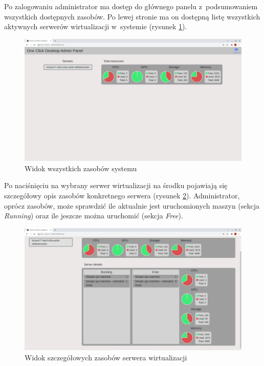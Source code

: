 \documentclass[../opis-rozwiazania.tex]{subfiles}
\begin{document}
Po zalogowaniu administrator ma dostęp do głównego panelu z~podsumowaniem wszystkich dostępnych zasobów.
Po lewej stronie ma on dostępną listę wszystkich aktywnych serwerów wirtualizacji w~systemie (rysunek \ref{figure:system_interaction.admin.panel}).

\begin{figure}[ht!]
  \centering
  \includegraphics[width=\textwidth]{resources/admin_panel_home.png}
  \caption{Widok wszystkich zasobów systemu}
  \label{figure:system_interaction.admin.panel}
\end{figure}

Po naciśnięciu na wybrany serwer wirtualizacji na środku pojawiają się szczegółowy opis zasobów konkretnego serwera (rysunek \ref{figure:system_interaction.admin.details}).
Administrator, oprócz zasobów, może sprawdzić ile aktualnie jest uruchomionych maszyn (sekcja \textit{Running}) oraz ile jeszcze można uruchomić (sekcja \textit{Free}).

\begin{figure}[ht!]
  \centering
  \includegraphics[width=\textwidth]{resources/admin_panel_details.png}
  \caption{Widok szczegółowych zasobów serwera wirtualizacji}
  \label{figure:system_interaction.admin.details}
\end{figure}
\end{document}
